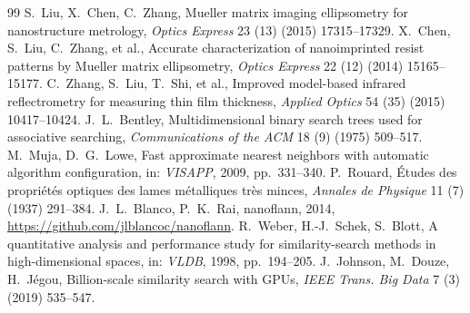 \documentclass[final,5p,times]{elsarticle}
\begin{document}
\begin{thebibliography}{99}
 S.~Liu, X.~Chen, C.~Zhang, Mueller matrix imaging ellipsometry for nanostructure metrology, \textit{Optics Express} 23 (13) (2015) 17315--17329.
 X.~Chen, S.~Liu, C.~Zhang, et al., Accurate characterization of nanoimprinted resist patterns by Mueller matrix ellipsometry, \textit{Optics Express} 22 (12) (2014) 15165--15177.
 C.~Zhang, S.~Liu, T.~Shi, et al., Improved model-based infrared reflectrometry for measuring thin film thickness, \textit{Applied Optics} 54 (35) (2015) 10417--10424.
 J.~L.~Bentley, Multidimensional binary search trees used for associative searching, \textit{Communications of the ACM} 18 (9) (1975) 509--517.
 M.~Muja, D.~G.~Lowe, Fast approximate nearest neighbors with automatic algorithm configuration, in: \textit{VISAPP}, 2009, pp.~331--340.
 P.~Rouard, \'Etudes des propri\'et\'es optiques des lames m\'etalliques tr\`es minces, \textit{Annales de Physique} 11 (7) (1937) 291--384.
 J.~L.~Blanco, P.~K.~Rai, nanoflann, 2014, \url{https://github.com/jlblancoc/nanoflann}.
 R.~Weber, H.-J.~Schek, S.~Blott, A quantitative analysis and performance study for similarity-search methods in high-dimensional spaces, in: \textit{VLDB}, 1998, pp.~194--205.
 J.~Johnson, M.~Douze, H.~J\'egou, Billion-scale similarity search with GPUs, \textit{IEEE Trans. Big Data} 7 (3) (2019) 535--547.
\end{thebibliography}
\end{document}
